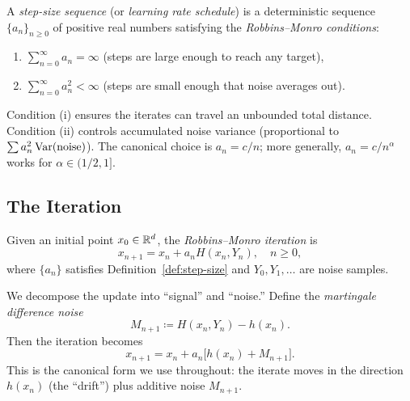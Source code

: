 \documentclass[11pt,a4paper]{article}
\begin{document}
\begin{definition}
\label{def:step-size}
A \emph{step-size sequence} (or \emph{learning rate schedule}) is a
deterministic sequence $\{a_n\}_{n \geq 0}$ of positive real numbers
satisfying the \emph{Robbins--Monro conditions}:
\begin{enumerate}[label=(\roman*)]
  \item $\displaystyle\sum_{n=0}^{\infty} a_n = \infty$
    \quad (steps are large enough to reach any target),
  \item $\displaystyle\sum_{n=0}^{\infty} a_n^2 < \infty$
    \quad (steps are small enough that noise averages out).
\end{enumerate}
\end{definition}

\begin{remark}
Condition (i) ensures the iterates can travel an unbounded total
distance. Condition (ii) controls accumulated noise variance (proportional
to $\sum a_n^2 \operatorname{Var}(\text{noise})$). The canonical choice is
$a_n = c/n$; more generally, $a_n = c/n^\alpha$ works for
$\alpha \in (1/2, 1]$.
\end{remark}

\subsection{The Iteration}

\begin{definition}
\label{def:rm-iteration}
Given an initial point $x_0 \in \mathbb{R}^d$, the \emph{Robbins--Monro
iteration} is
\begin{equation}
\label{eq:rm}
  x_{n+1} = x_n + a_n H(x_n, Y_n), \quad n \geq 0,
\end{equation}
where $\{a_n\}$ satisfies Definition~\ref{def:step-size} and
$Y_0, Y_1, \ldots$ are noise samples.
\end{definition}

We decompose the update into ``signal'' and ``noise.'' Define the
\emph{martingale difference noise}
\begin{equation}
\label{eq:mds-noise}
  M_{n+1} \coloneqq H(x_n, Y_n) - h(x_n).
\end{equation}
Then the iteration becomes
\begin{equation}
\label{eq:rm-decomposed}
  x_{n+1} = x_n + a_n\bigl[h(x_n) + M_{n+1}\bigr].
\end{equation}
This is the canonical form we use throughout: the iterate moves in the
direction $h(x_n)$ (the ``drift'') plus additive noise $M_{n+1}$.
\end{document}
